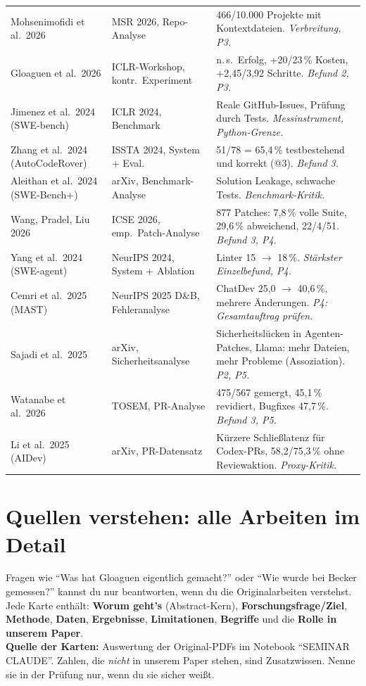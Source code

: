 \documentclass[12pt,a4paper]{article}
\begin{document}
\begin{longtable}{@{}p{3.5cm}p{3.3cm}p{9.1cm}@{}}
Mohsenimofidi et al.\ 2026 & MSR 2026, Repo-Analyse & 466/10.000 Projekte mit Kontextdateien. \emph{Verbreitung, P3.} \\
Gloaguen et al.\ 2026 & ICLR-Workshop, kontr.\ Experiment & n.\,s.\ Erfolg, +20/23\,\% Kosten, +2,45/3,92 Schritte. \emph{Befund 2, P3.} \\
Jimenez et al.\ 2024 (SWE-bench) & ICLR 2024, Benchmark & Reale GitHub-Issues, Prüfung durch Tests. \emph{Messinstrument, Python-Grenze.} \\
Zhang et al.\ 2024 (AutoCodeRover) & ISSTA 2024, System + Eval. & 51/78 = 65,4\,\% testbestehend und korrekt (@3). \emph{Befund 3.} \\
Aleithan et al.\ 2024 (SWE-Bench+) & arXiv, Benchmark-Analyse & Solution Leakage, schwache Tests. \emph{Benchmark-Kritik.} \\
Wang, Pradel, Liu 2026 & ICSE 2026, emp.\ Patch-Analyse & 877 Patches: 7,8\,\% volle Suite, 29,6\,\% abweichend, 22/4/51. \emph{Befund 3, P4.} \\
Yang et al.\ 2024 (SWE-agent) & NeurIPS 2024, System + Ablation & Linter 15 $\to$ 18\,\%. \emph{Stärkster Einzelbefund, P4.} \\
Cemri et al.\ 2025 (MAST) & NeurIPS 2025 D\&B, Fehleranalyse & ChatDev 25,0 $\to$ 40,6\,\%, mehrere Änderungen. \emph{P4: Gesamtauftrag prüfen.} \\
Sajadi et al.\ 2025 & arXiv, Sicherheitsanalyse & Sicherheitslücken in Agenten-Patches, Llama: mehr Dateien, mehr Probleme (Assoziation). \emph{P2, P5.} \\
Watanabe et al.\ 2026 & TOSEM, PR-Analyse & 475/567 gemergt, 45,1\,\% revidiert, Bugfixes 47,7\,\%. \emph{Befund 3, P5.} \\
Li et al.\ 2025 (AIDev) & arXiv, PR-Datensatz & Kürzere Schließlatenz für Codex-PRs, 58,2/75,3\,\% ohne Reviewaktion. \emph{Proxy-Kritik.} \\
\bottomrule
\end{longtable}

\section{Quellen verstehen: alle Arbeiten im Detail}
\label{sec:verstehen}

\begin{tipp}
Fragen wie \enquote{Was hat Gloaguen eigentlich gemacht?} oder \enquote{Wie wurde bei Becker gemessen?} kannst du nur beantworten, wenn du die Originalarbeiten verstehst. Jede Karte enthält: \textbf{Worum geht's} (Abstract-Kern), \textbf{Forschungsfrage/Ziel}, \textbf{Methode}, \textbf{Daten}, \textbf{Ergebnisse}, \textbf{Limitationen}, \textbf{Begriffe} und die \textbf{Rolle in unserem Paper}.\\
\textbf{Quelle der Karten:} Auswertung der Original-PDFs im Notebook \enquote{SEMINAR CLAUDE}. Zahlen, die \emph{nicht} in unserem Paper stehen, sind Zusatzwissen. Nenne sie in der Prüfung nur, wenn du sie sicher weißt.
\end{tipp}
\end{document}

